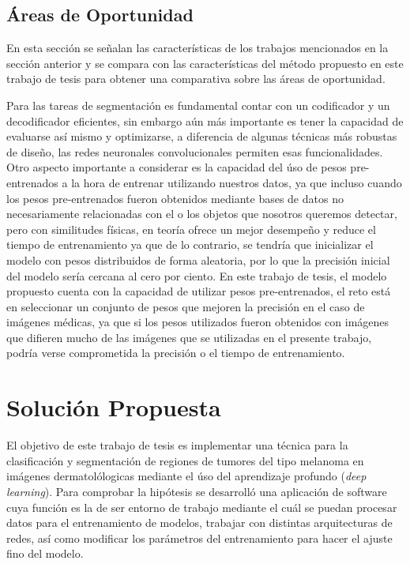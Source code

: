 \newpage

\section{Áreas de Oportunidad}
En esta sección se señalan las características de los trabajos mencionados en la sección anterior y se compara con las características del método propuesto en este trabajo de tesis para obtener una comparativa sobre las áreas de oportunidad.

Para las tareas de segmentación es fundamental contar con un codificador y un decodificador eficientes, sin embargo aún más importante es tener la capacidad de evaluarse así mismo y optimizarse, a diferencia de algunas técnicas más robustas de diseño, las redes neuronales convolucionales permiten esas funcionalidades. Otro aspecto importante a considerar es la capacidad del úso de pesos pre-entrenados a la hora de entrenar utilizando nuestros datos, ya que incluso cuando los pesos pre-entrenados fueron obtenidos mediante bases de datos no necesariamente relacionadas con el o los objetos que nosotros queremos detectar, pero con similitudes físicas, en teoría ofrece un mejor desempeño y reduce el tiempo de entrenamiento ya que de lo contrario, se tendría que inicializar el modelo con pesos distribuidos de forma aleatoria, por lo que la precisión inicial del modelo sería cercana al cero por ciento. En este trabajo de tesis, el modelo propuesto cuenta con la capacidad de utilizar pesos pre-entrenados, el reto está en seleccionar un conjunto de pesos que mejoren la precisión en el caso de imágenes médicas, ya que si los pesos utilizados fueron obtenidos con imágenes que difieren mucho de las imágenes que se utilizadas en el presente trabajo, podría verse comprometida la precisión o el tiempo de entrenamiento.

\chapter{Solución Propuesta}
El objetivo de este trabajo de tesis es implementar una técnica para la clasificación y segmentación de regiones de tumores del tipo melanoma en imágenes dermatolólogicas mediante el úso del aprendizaje profundo (\emph{deep learning}). Para comprobar la hipótesis se desarrolló una aplicación de software cuya función es la de ser entorno de trabajo mediante el cuál se puedan procesar datos para el entrenamiento de modelos, trabajar con distintas arquitecturas de redes, así como modificar los parámetros del entrenamiento para hacer el ajuste fino del modelo.

